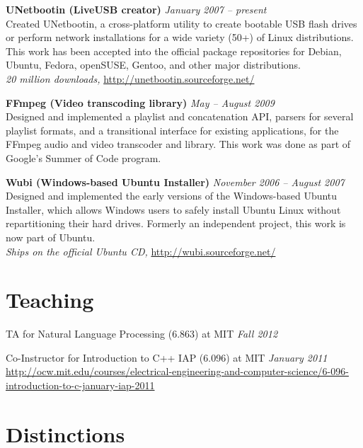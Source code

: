 \documentclass[margin,line]{resume}
\begin{document}
\begin{resume}
\textbf{UNetbootin (LiveUSB creator)} \hfill \textsl{January 2007 -- present}\\
Created UNetbootin, a cross-platform utility to create bootable USB flash drives or perform network installations for a wide variety (50+) of Linux distributions. This work has been accepted into the official package repositories for Debian, Ubuntu, Fedora, openSUSE, Gentoo, and other major distributions. \\
\emph{20 million downloads,} \url{http://unetbootin.sourceforge.net/}

\textbf{FFmpeg (Video transcoding library)} \hfill \textsl{May -- August 2009}\\
Designed and implemented a playlist and concatenation API, parsers for several playlist formats, and a transitional interface for existing applications, for the FFmpeg audio and video transcoder and library. This work was done as part of Google's Summer of Code program.

\textbf{Wubi (Windows-based Ubuntu Installer)} \hfill \textsl{November 2006 -- August 2007}\\
Designed and implemented the early versions of the Windows-based Ubuntu Installer, which allows Windows users to safely install Ubuntu Linux without repartitioning their hard drives. Formerly an independent project, this work is now part of Ubuntu. \\
\emph{Ships on the official Ubuntu CD,} \url{http://wubi.sourceforge.net/}

\section{\mysidestyle Teaching}

TA for Natural Language Processing (6.863) at MIT \hfill \textsl{Fall 2012}

Co-Instructor for Introduction to C++ IAP (6.096) at MIT \hfill \textsl{January 2011}\\
\url{http://ocw.mit.edu/courses/electrical-engineering-and-computer-science/6-096-introduction-to-c-january-iap-2011}



\section{\mysidestyle Distinctions}


\end{resume}
\end{document}
